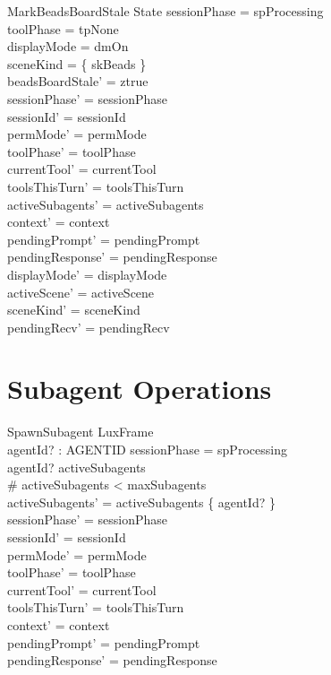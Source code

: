 \documentclass[a4paper,10pt,fleqn]{article}
\begin{document}
\begin{schema}{MarkBeadsBoardStale}
  \Delta State
  \where
  sessionPhase = spProcessing \\
  toolPhase = tpNone \\
  displayMode = dmOn \\
  sceneKind = \{ skBeads \} \\
  beadsBoardStale' = ztrue \\
  sessionPhase' = sessionPhase \\
  sessionId' = sessionId \\
  permMode' = permMode \\
  toolPhase' = toolPhase \\
  currentTool' = currentTool \\
  toolsThisTurn' = toolsThisTurn \\
  activeSubagents' = activeSubagents \\
  context' = context \\
  pendingPrompt' = pendingPrompt \\
  pendingResponse' = pendingResponse \\
  displayMode' = displayMode \\
  activeScene' = activeScene \\
  sceneKind' = sceneKind \\
  pendingRecv' = pendingRecv
\end{schema}

\section{Subagent Operations}

\begin{schema}{SpawnSubagent}
  LuxFrame \\
  agentId? : AGENTID
  \where
  sessionPhase = spProcessing \\
  agentId? \notin activeSubagents \\
  \# activeSubagents < maxSubagents \\
  activeSubagents' = activeSubagents \cup \{ agentId? \} \\
  sessionPhase' = sessionPhase \\
  sessionId' = sessionId \\
  permMode' = permMode \\
  toolPhase' = toolPhase \\
  currentTool' = currentTool \\
  toolsThisTurn' = toolsThisTurn \\
  context' = context \\
  pendingPrompt' = pendingPrompt \\
  pendingResponse' = pendingResponse
\end{schema}
\end{document}
